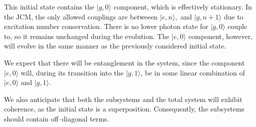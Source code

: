 \documentclass[11pt]{article}
\begin{document}
This initial state contains the $|g,0\rangle$ component, which is effectively stationary. In the JCM, the only allowed couplings are betweeen $|e,n\rangle,$ and $|g,n+1\rangle$ due to excitation number conservation. There is no lower photon state for $|g,0\rangle$ couple to,  so it remains unchanged during the evolution. The $|e,0\rangle$ component, however, will evolve in the same manner as the previously considered initial state. 

We expect that there will be entanglement in the system, since the component $|e,0\rangle$ will, during its transition into the $|g,1\rangle$, be in some linear combination of $|e,0\rangle$ and $|g,1\rangle$. 

We also anticipate that both the subsystems and the total system will exhibit coherence, as the initial state is a superposition. Consequently, the subsystems should contain off--diagonal terms.\\
\end{document}
